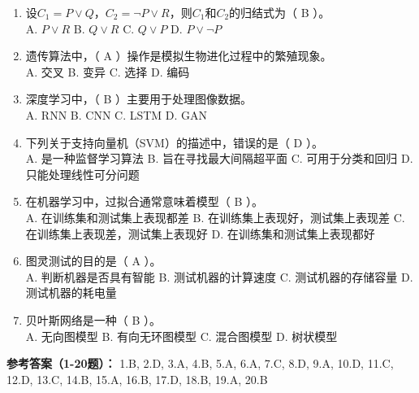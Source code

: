 \begin{enumerate}[leftmargin=2em,itemsep=1pt]
\item 设$C_1=P \lor Q$，$C_2=\neg P \lor R$，则$C_1$和$C_2$的归结式为（ B ）。
\\ A. $P \lor R$ B. $Q \lor R$ C. $Q \lor P$ D. $P \lor \neg P$
\item 遗传算法中，（ A ）操作是模拟生物进化过程中的繁殖现象。
\\ A. 交叉 B. 变异 C. 选择 D. 编码
\item 深度学习中，（ B ）主要用于处理图像数据。
\\ A. RNN B. CNN C. LSTM D. GAN
\item 下列关于支持向量机（SVM）的描述中，错误的是（ D ）。
\\ A. 是一种监督学习算法 B. 旨在寻找最大间隔超平面 C. 可用于分类和回归 D. 只能处理线性可分问题
\item 在机器学习中，过拟合通常意味着模型（ B ）。
\\ A. 在训练集和测试集上表现都差 B. 在训练集上表现好，测试集上表现差 C. 在训练集上表现差，测试集上表现好 D. 在训练集和测试集上表现都好
\item 图灵测试的目的是（ A ）。
\\ A. 判断机器是否具有智能 B. 测试机器的计算速度 C. 测试机器的存储容量 D. 测试机器的耗电量
\item 贝叶斯网络是一种（ B ）。
\\ A. 无向图模型 B. 有向无环图模型 C. 混合图模型 D. 树状模型
\end{enumerate}

\textbf{参考答案（1-20题）：}
1.B, 2.D, 3.A, 4.B, 5.A, 6.A, 7.C, 8.D, 9.A, 10.D, 
11.C, 12.D, 13.C, 14.B, 15.A, 16.B, 17.D, 18.B, 19.A, 20.B

